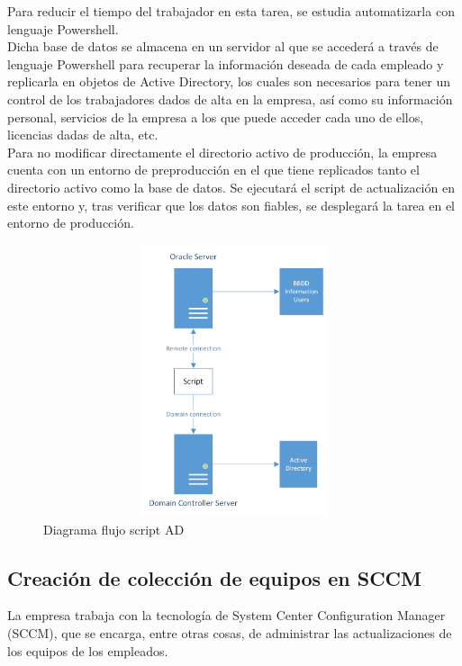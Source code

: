 \documentclass[a4paper, 12pt]{book}
\begin{document}
Para reducir el tiempo del trabajador en esta tarea, se estudia automatizarla con lenguaje Powershell.
\\

Dicha base de datos se almacena en un servidor al que se accederá a través de lenguaje Powershell para recuperar la información deseada de cada empleado y replicarla en objetos de Active Directory, los cuales son necesarios para tener un control de los trabajadores dados de alta en la empresa, así como su información personal, servicios de la empresa a los que puede acceder cada uno de ellos, licencias dadas de alta, etc.
\\

Para no modificar directamente el directorio activo de producción, la empresa cuenta con un entorno de preproducción en el que tiene replicados tanto el directorio activo como la base de datos. Se ejecutará el script de actualización en este entorno y, tras verificar que los datos son fiables, se desplegará la tarea en el entorno de producción.

\begin{figure}[H]
	\centering
	\includegraphics[width=15cm, height=8cm, keepaspectratio]{img/UpdateUsers_diagrama.png}
	\caption{Diagrama flujo script AD}
	\label{fig:UpdateUsers_diagrama}
\end{figure}

\subsection{Creación de colección de equipos en SCCM}
\label{Creación de colección de equipos en SCCM}

La empresa trabaja con la tecnología de System Center Configuration Manager (SCCM), que se encarga, entre otras cosas, de administrar las actualizaciones de los equipos de los empleados.
\\
\end{document}
